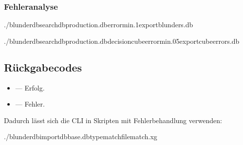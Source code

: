 \documentclass[letterpaper,10pt,german]{sphinxmanual}
\begin{document}
\subsubsection{Fehleranalyse}
\label{\detokenize{cli:analyse-des-erreurs}}
\begin{sphinxVerbatim}[commandchars=\\\{\}]
./blunderdbsearch\PYGZhy{}\PYGZhy{}dbproduction.db\PYGZhy{}\PYGZhy{}error\PYGZhy{}min.1\PYGZhy{}\PYGZhy{}exportblunders.db

./blunderdbsearch\PYGZhy{}\PYGZhy{}dbproduction.db\PYGZhy{}\PYGZhy{}decisioncube\PYGZhy{}\PYGZhy{}error\PYGZhy{}min.05\PYGZhy{}\PYGZhy{}exportcube\PYGZus{}errors.db
\end{sphinxVerbatim}


\subsection{Rückgabecodes}
\label{\detokenize{cli:codes-de-retour}}\begin{itemize}
\item {} 
\sphinxAtStartPar
{} — Erfolg.

\item {} 
\sphinxAtStartPar
{} — Fehler.

\end{itemize}

\sphinxAtStartPar
Dadurch lässt sich die CLI in Skripten mit Fehlerbehandlung verwenden:

\begin{sphinxVerbatim}[commandchars=\\\{\}]
./blunderdbimport\PYGZhy{}\PYGZhy{}dbbase.db\PYGZhy{}\PYGZhy{}typematch\PYGZhy{}\PYGZhy{}filematch.xg
\end{sphinxVerbatim}
\end{document}
